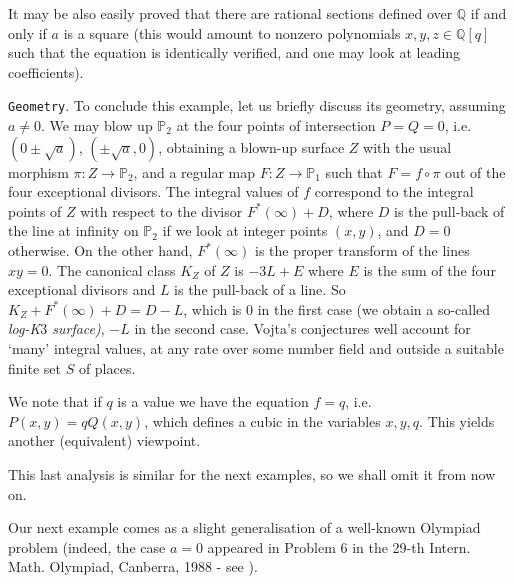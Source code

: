 \documentclass[leqno,12pt]{article} %
\def\Q{{{\mathbb Q}}}
\def\P{{{\mathbb P}}}
\theoremstyle{plain} %
\theoremstyle{definition} %
\begin{document}
It may be also  easily proved that there are rational sections defined over $\Q$  if and only if $a$ is a square (this would amount to nonzero polynomials $x,y,z\in\Q[q]$ such that the equation is identically verified, and  one may look at leading coefficients). 

\medskip

{\tt Geometry}.  To conclude this example, let us briefly discuss its geometry, assuming $a\neq 0$. We may blow up $\P_2$ at the four points of intersection $P=Q=0$, i.e. $(0\pm\sqrt a)$, $(\pm\sqrt a,0)$, obtaining a  blown-up surface $Z$ with the usual morphism $\pi:Z\to \P_2$, and a regular map $F:Z\to \P_1$  such that $F=f\circ \pi$ out  of the four exceptional divisors.  The integral values of $f$ correspond to the integral points of $Z$ with respect to the divisor $F^*(\infty)+D$, where $D$ is the pull-back of the line at infinity on $\P_2$ if we look at integer points $(x,y)$, and $D=0$ otherwise.  On the other hand, $F^*(\infty)$ is the proper transform of the lines $xy=0$.  The canonical class $K_Z$ of $Z$ is $-3L+E$ where $E$ is the sum of the four exceptional divisors and $L$ is the pull-back of a line.  So $K_Z+F^*(\infty)+D=D-L$, which is $0$ in the first case (we obtain a so-called {\it log-K$3$ surface)}, $-L$ in the second case.  Vojta's conjectures well account for `many' integral values, at any rate over some number field and outside a suitable finite set $S$ of places.

We note that if $q$ is a value we have  the equation $f=q$, i.e. $P(x,y)=qQ(x,y)$, which defines a cubic in the variables $x,y,q$. This yields another (equivalent) viewpoint. 

This last analysis is similar for the next examples, so we shall omit it from now on.

Our next example comes as a slight generalisation of a well-known Olympiad problem (indeed, the case $a=0$ appeared in Problem 6 in the 29-th Intern. Math. Olympiad, Canberra, 1988 - see \cite{DJMP}).
\end{document}
